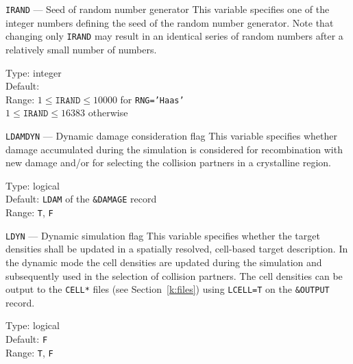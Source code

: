 \begin{keydescription}{\texttt{IRAND} --- Seed of random number generator}
%
  This variable specifies one of the integer numbers defining the seed of
  the random number generator. Note that changing only \texttt{IRAND}
  may result in an identical series of random numbers after a
  relatively small number of numbers. 
%
  \begin{keytab}
    Type:    \> integer \\
    Default:  \\
    Range:   \> $1 \le \texttt{IRAND} \le 10000$ for \texttt{RNG='Haas'} \\
             \> $1 \le \texttt{IRAND} \le 16383$ otherwise
  \end{keytab}
\end{keydescription}

\begin{keydescription}{\texttt{LDAMDYN} --- Dynamic damage consideration flag}
%
  This variable specifies whether damage accumulated during the simulation is
  considered for recombination with new damage and/or for selecting the
  collision partners in a crystalline region.
%
  \begin{keytab}
    Type:    \> logical \\
    Default: \> \texttt{LDAM} of the \texttt{\&DAMAGE} record \\
    Range:   \> \texttt{T}, \texttt{F}
  \end{keytab}
\end{keydescription}

\begin{keydescription}{\texttt{LDYN} --- Dynamic simulation flag}
%
  This variable specifies whether the target densities shall be
  updated in a spatially resolved, cell-based target description.  In
  the dynamic mode the cell densities are updated during the simulation
  and subsequently used in the selection of collision partners.  The cell 
  densities can be output to the \texttt{CELL*} files (see 
  Section~\ref{k:files}) using \texttt{LCELL=T} on the \texttt{\&OUTPUT}
  record.
%
  \begin{keytab}
    Type:    \> logical \\
    Default: \> \texttt{F} \\
    Range:   \> \texttt{T}, \texttt{F}
  \end{keytab}
\end{keydescription}

